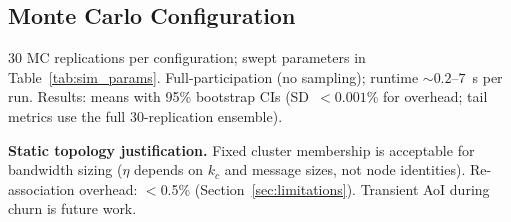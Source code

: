 \documentclass[journal]{IEEEtran}
\begin{document}
\subsection{Monte Carlo Configuration}

30 MC replications per configuration; swept parameters in Table~\ref{tab:sim_params}. Full-participation (no sampling); runtime ${\sim}0.2$--$7$~s per run. Results: means with 95\% bootstrap CIs (SD~$< 0.001\%$ for overhead; tail metrics use the full 30-replication ensemble).

\textbf{Static topology justification.} Fixed cluster membership is acceptable for bandwidth sizing ($\eta$ depends on $k_c$ and message sizes, not node identities). Re-association overhead: $<$0.5\% (Section~\ref{sec:limitations}). Transient AoI during churn is future work.
\end{document}
